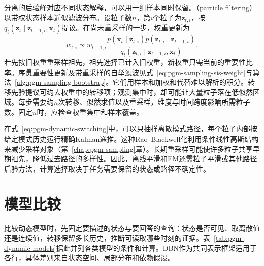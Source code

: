 分离的后验峰对应不同状态解释，可以用一组样本同时保留。（particle filtering）以带权状态样本近似滤波分布。设粒子数$n$，第$i$个粒子为$\bm z_{t,i}$，按$q_t(\bm z_t\mid\bm z_{t-1,i},\bm x_t)$提议。在尚未重采样的一步，权重更新为
\[
  w_{t,i}\propto w_{t-1,i}
    \frac{p(\bm x_t\mid\bm z_{t,i})
      p(\bm z_{t,i}\mid\bm z_{t-1,i})}
      {q_t(\bm z_{t,i}\mid\bm z_{t-1,i},\bm x_t)}.
\]
若先按旧权重重采样祖先，祖先选择已计入旧权重，新权重只需当前的重要性比率。序贯重要性更新及带重采样的自举滤波见式~\eqref{eq:pgm-sampling-sis-weight}与算法~\ref{alg:pgm-sampling-bootstrap}。它们用样本和加权和代替难以解析的积分。转移先验提议可约去权重中的转移项；观测集中时，却可能让大量粒子落在低似然区域。每步需要约$n$次转移、似然求值以及重采样，维度与时间跨度影响所需粒子数。固定$n$时，应检查权重集中和样本覆盖。

在式~\eqref{eq:pgm-dynamic-switching}中，可以只抽样离散模式路径，每个粒子内部按给定模式历史运行精确Kalman递推。这种Rao--Blackwell化利用条件线性高斯结构来减少采样对象（第~\ref{chap:pgm-sampling}章）。长期重采样可能使许多粒子共享早期祖先，降低过去路径的多样性。因此，离线平滑和EM还需粒子平滑或其他路径后验方法，计算选择取决于任务需要保留的状态或路径不确定性。

\section{模型比较}
\label{sec:pgm-dynamic-comparison}

比较动态模型时，先固定要描述的状态与要回答的查询：状态是否可见、取离散值还是连续值，转移保留多长历史，推断可读取哪些时刻的证据。表~\ref{tab:pgm-dynamic-models}据此并列各类模型的条件和计算。DBN作为共同表示框架适用于各行，具体差别来自状态空间、局部分布和依赖假设。

